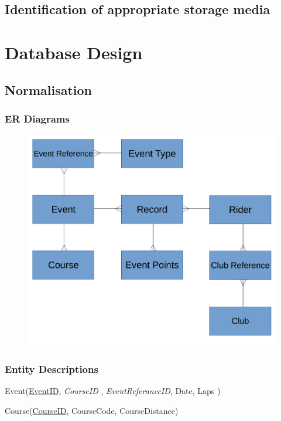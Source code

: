 \subsection{Identification of appropriate storage media}

\section{Database Design}

\subsection{Normalisation}

\subsubsection{ER Diagrams}
\begin{figure}[H]
    \includegraphics[width=\textwidth]{./ER/ERDesing.pdf}
\end{figure}

\subsubsection{Entity Descriptions}

Event(\underline{EventID}, \emph{CourseID} , \emph{EventReferanceID}, Date, Laps )

Course(\underline{CourseID}, CourseCode, CourseDistance)

